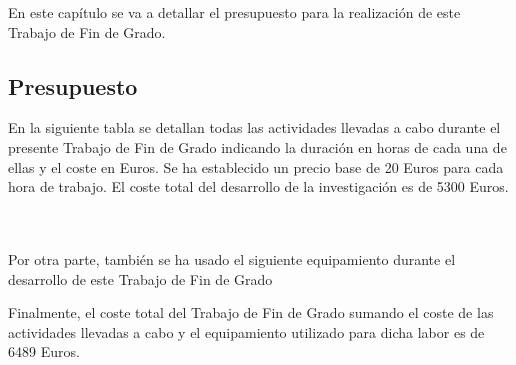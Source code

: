

En este capítulo se va a detallar el presupuesto para la realización de este Trabajo de Fin de Grado.

\subsection{Presupuesto}

En la siguiente tabla se detallan todas las actividades llevadas a cabo durante el presente Trabajo de Fin de Grado indicando la duración en horas de cada una de ellas y el coste en Euros. 
Se ha establecido un precio base de 20 Euros para cada hora de trabajo. El coste total del desarrollo de la investigación es de 5300 Euros.


\\
\bigskip    
\\
Por otra parte, también se ha usado el siguiente equipamiento durante el desarrollo de este Trabajo de Fin de Grado





Finalmente, el coste total del Trabajo de Fin de Grado sumando el coste de las actividades llevadas a cabo y el equipamiento utilizado para dicha labor es de 6489 Euros.